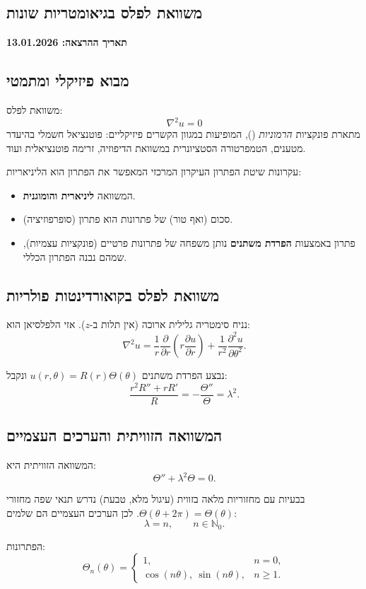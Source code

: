 
\subsection{משוואת לפלס בגיאומטריות שונות}
\textbf{תאריך ההרצאה: 13.01.2026}

\subsection{מבוא פיזיקלי ומתמטי}
משוואת לפלס:
\[
\nabla^2 u = 0
\]
מתארת פונקציות \emph{הרמוניות} (), המופיעות במגוון הקשרים פיזיקליים:
פוטנציאל חשמלי בהיעדר מטענים, הטמפרטורה הסטציונרית במשוואת הדיפוזיה, זרימה פוטנציאלית ועוד.

\begin{mainbox}{עקרונות שיטת הפתרון}
העיקרון המרכזי המאפשר את הפתרון הוא הליניאריות:
\begin{itemize}
    \item המשוואה \textbf{ליניארית והומוגנית}.
    \item סכום (ואף טור) של פתרונות הוא פתרון (סופרפוזיציה).
    \item פתרון באמצעות \textbf{הפרדת משתנים} נותן משפחה של פתרונות פרטיים (פונקציות עצמיות), שמהם נבנה הפתרון הכללי.
\end{itemize}
\end{mainbox}

\subsection{משוואת לפלס בקואורדינטות פולריות}
נניח סימטריה גלילית ארוכה (אין תלות ב-\(z\)). אזי הלפלסיאן הוא:
\[
\nabla^2 u =
\frac{1}{r}\frac{\partial}{\partial r}
\left(r\frac{\partial u}{\partial r}\right)
+ \frac{1}{r^2}\frac{\partial^2 u}{\partial \theta^2}.
\]

נבצע הפרדת משתנים \(u(r,\theta)=R(r)\Theta(\theta)\) ונקבל:
\[
\frac{r^2 R'' + r R'}{R} = -\frac{\Theta''}{\Theta} = \lambda^2.
\]

\subsection{המשוואה הזוויתית והערכים העצמיים}
המשוואה הזוויתית היא:
\[
\Theta'' + \lambda^2 \Theta = 0.
\]

בבעיות עם מחזוריות מלאה בזווית (עיגול מלא, טבעת) נדרש תנאי שפה מחזורי \(\Theta(\theta+2\pi)=\Theta(\theta)\). לכן הערכים העצמיים הם שלמים:
\[
\lambda = n,\qquad n\in\mathbb{N}_0.
\]

הפתרונות:
\[
\Theta_n(\theta)=
\begin{cases}
1, & n=0,\\
\cos(n\theta),\ \sin(n\theta), & n\ge 1.
\end{cases}
\]

